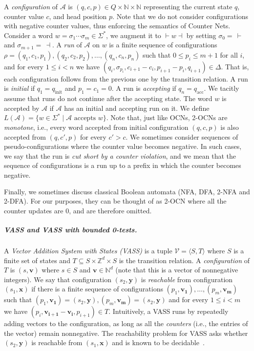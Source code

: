 \documentclass[11pt,a4paper]{amsart}
\theoremstyle{definition}
\newcommand{\tup}[1]{\langle #1 \rangle}
\newcommand{\lmark}{\vdash}
\newcommand{\rmark}{\dashv}
\newcommand{\initstate}{q_{\mathrm{init}}}
\newcommand{\accstate}{q_{\mathrm{acc}}}
\renewcommand{\vec}[1]{\boldsymbol{#1}}
\newcommand{\bbN}{\mathbb{N}}
\newcommand{\bbZ}{\mathbb{Z}}
\newcommand{\cA}{\mathcal{A}}
\newcommand{\cV}{\mathcal{V}}
\begin{document}
	A \emph{configuration} of $\cA$ is $(q,c,p)\in Q\times \bbN\times \bbN$ representing the
	current state $q$, counter value $c$, and head position $p$. Note that we do not
	consider configurations with negative counter values, thus enforcing the
	semantics of Counter Nets.
	Consider a word $w=\sigma_1\cdots \sigma_m\in \Sigma^*$, we augment it to $\lmark w\rmark$ by setting
	$\sigma_0=\,\lmark$ and $\sigma_{m+1}=\,\rmark$.  A \emph{run} of $\cA$ on $w$ is a finite
	sequence of configurations $\rho=(q_1,c_1,p_1),(q_2,c_2,p_2),\ldots,(q_{n},c_{n},p_{n})$
	such that $0\le p_i\le m+1$ for all \(i\), and for every $1\le i< n$ we have
	$(q_{i},\sigma_{p_i},c_{i+1}-c_i,p_{i+1}-p_i,q_{i+1})\in \Delta$. That is, each
	configuration follows from the previous one by the transition relation.  A run
	is \emph{initial} if $q_1=\initstate$ and $p_1=c_1=0$. A run is \emph{accepting}
	if $q_n=\accstate$. We tacitly assume that runs do not continue after the
	accepting state. The word $w$ is accepted by $\cA$ if $\cA$ has an initial and accepting
	run on it. We define $L(\cA)=\{w\in \Sigma^* \mid \cA \text{ accepts }w\}$. Note that, just like OCNs, 2-OCNs are \emph{monotone}, i.e., every word accepted from initial configuration $(q,c,p)$ is also accepted from $(q,c',p)$ for every $c'>c$. We sometimes
	consider sequences of pseudo-configurations where the counter value becomes
	negative. In such cases, we say that the run is \emph{cut short by a counter
		violation}, and we mean that the sequence of configurations is a run up to a
	prefix in which the counter becomes negative.
	
	Finally, we sometimes discuss classical Boolean automata (NFA, DFA, 2-NFA and
	2-DFA). For our purposes, they can be thought of as 2-OCN where all the counter
	updates are $0$, and are therefore omitted.
	
	
	\subparagraph*{VASS and VASS with bounded 0-tests.} A \emph{Vector Addition
		System with States (VASS)} is a tuple $\cV=\tup{S,T}$ where $S$ is a finite
	set of states and $T\subseteq S\times \bbZ^d\times S$ is the transition relation. A
	\emph{configuration} of $T$ is $(s,\vec{v})$ where $s\in S$ and
	$\vec{v}\in \bbN^d$ (note that this is a vector of nonnegative integers). We say
	that configuration $(s_2,\vec{y})$ is \emph{reachable} from configuration
	$(s_1,\vec{x})$ if there is a finite sequence of configurations
	$(p_1,\vec{v_1}),\ldots,(p_m,\vec{v_m})$ such that
	$(p_1,\vec{v_1})=(s_2,\vec{y}), (p_m,\vec{v_m})=(s_2,\vec{y})$ and for every
	$1\le i<m$ we have $(p_i,\vec{v_{i+1}}-\vec{v_i},p_{i+1})\in T$.  Intuitively, a
	VASS runs by repeatedly adding vectors to the configuration, as long as all the
	\emph{counters} (i.e., the entries of the vector) remain nonnegative.  The
	reachability problem for VASS asks whether $(s_2,\vec{y})$ is reachable from
	$(s_1,\vec{x})$ and is known to be decidable~\cite{czerwinski2022reachability}.
	
\end{document}
